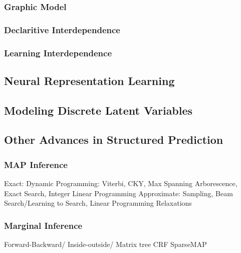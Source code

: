 \subsubsection{Graphic Model}

\subsubsection{Declaritive Interdependence}

\subsubsection{Learning Interdependence}

\subsection{Neural Representation Learning}

\subsection{Modeling Discrete Latent Variables}

\subsection{Other Advances in Structured Prediction}
\subsubsection{MAP Inference}
Exact: Dynamic Programming: Viterbi, CKY, Max Spanning Arborescence, Exact Search, Integer Linear Programming
Approximate: Sampling, Beam Search/Learning to Search, Linear Programming Relaxations

\subsubsection{Marginal Inference}
Forward-Backward/ Inside-outside/ Matrix tree
CRF
SparseMAP

